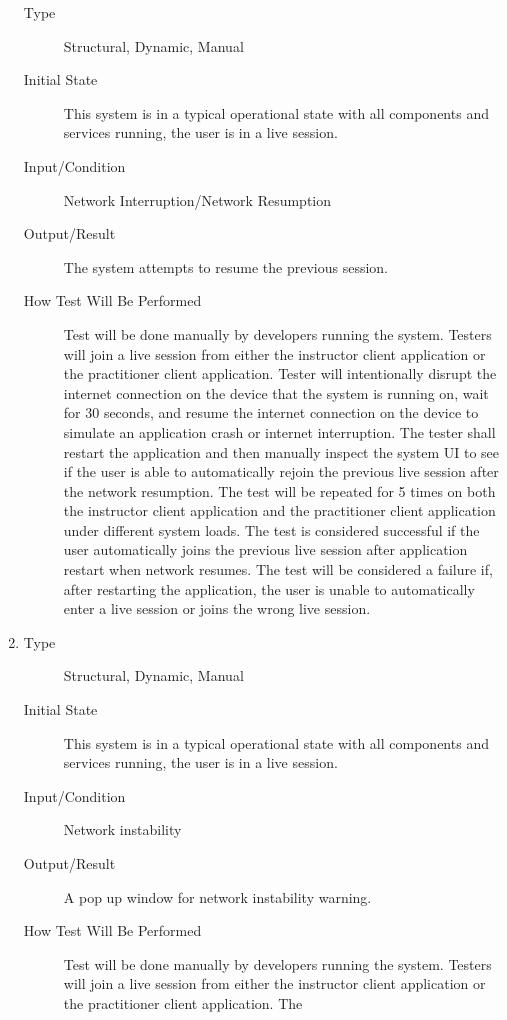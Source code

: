 \documentclass[12pt, titlepage]{article}
\begin{document}
\begin{enumerate}[NFR-T1]
  \begin{description}
  \item[Type] Structural, Dynamic, Manual
  \item[Initial State] This system is in a typical operational state with all
    components and services running, the user is in a live session.
  \item[Input/Condition] Network Interruption/Network Resumption
  \item[Output/Result] The system attempts to resume the previous session.
  \item[How Test Will Be Performed] Test will be done manually by developers
    running the system. Testers will join a live session from either the
    instructor client application or the practitioner client application. Tester
    will intentionally disrupt the internet connection on the device that the
    system is running on, wait for 30 seconds, and resume the internet
    connection on the device to simulate an application crash or internet
    interruption. The tester shall restart the application and then manually
    inspect the system UI to see if the user is able to automatically rejoin the
    previous live session after the network resumption. The test will be
    repeated for 5 times on both the instructor client application and the
    practitioner client application under different system loads. The test is
    considered successful if the user automatically joins the previous live
    session after application restart when network resumes. The test will be
    considered a failure if, after restarting the application, the user is
    unable to automatically enter a live session or joins the wrong live
    session.
  \end{description}
\item \label{NFRT8}
  \begin{description}
  \item[Type] Structural, Dynamic, Manual
  \item[Initial State] This system is in a typical operational state with all
    components and services running, the user is in a live session.
  \item[Input/Condition] Network instability
  \item[Output/Result] A pop up window for network instability warning.
  \item[How Test Will Be Performed] Test will be done manually by developers
    running the system. Testers will join a live session from either the
    instructor client application or the practitioner client application. The

\end{description}
\end{enumerate}
\end{document}
